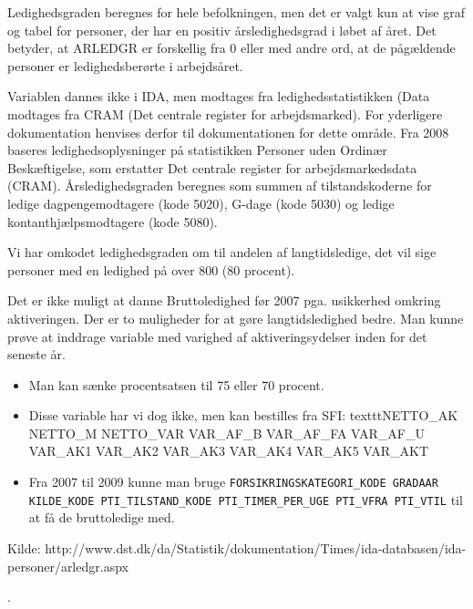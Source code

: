 Ledighedsgraden beregnes for hele befolkningen, men det er valgt kun at vise graf og tabel for personer, der har en positiv årsledighedsgrad i løbet af året. Det betyder, at ARLEDGR er forskellig fra 0 eller med andre ord, at de pågældende personer er ledighedsberørte i arbejdsåret.

Variablen dannes ikke i IDA, men modtages fra ledighedsstatistikken (Data modtages fra CRAM (Det centrale register for arbejdsmarked). For yderligere dokumentation henvises derfor til dokumentationen for dette område. Fra 2008 baseres ledighedsoplysninger på statistikken Personer uden Ordinær Beskæftigelse, som erstatter Det centrale register for arbejdsmarkedsdata (CRAM). Årsledighedsgraden beregnes som summen af tilstandskoderne for ledige dagpengemodtagere (kode 5020), G-dage (kode 5030) og ledige kontanthjælpsmodtagere (kode 5080).

Vi har omkodet ledighedsgraden om til andelen af langtidsledige, det vil sige personer med en ledighed på over 800 (80 procent).

Det er ikke muligt at danne Bruttoledighed før 2007 pga. usikkerhed omkring aktiveringen. Der er to muligheder for at gøre langtidsledighed bedre.
Man kunne prøve at inddrage variable med varighed af aktiveringsydelser inden for det seneste år. 
\begin{itemize} [topsep=6pt,itemsep=-1ex]
  \item Man kan sænke procentsatsen til 75 eller 70 procent.
  \item Disse variable har vi dog ikke, men kan bestilles fra SFI: texttt{NETTO_AK NETTO_M NETTO_VAR VAR_AF_B VAR_AF_FA VAR_AF_U VAR_AK1 VAR_AK2 VAR_AK3 VAR_AK4 VAR_AK5 VAR_AKT}
  \item Fra 2007 til 2009 kunne man bruge \texttt{FORSIKRINGSKATEGORI_KODE GRADAAR KILDE_KODE PTI_TILSTAND_KODE PTI_TIMER_PER_UGE PTI_VFRA PTI_VTIL} til at få de bruttoledige med.
\end{itemize}

Kilde: http://www.dst.dk/da/Statistik/dokumentation/Times/ida-databasen/ida-personer/arledgr.aspx




\parencite[158]{Bourdieu1986}. 

\parencite[185]{DST2014}











